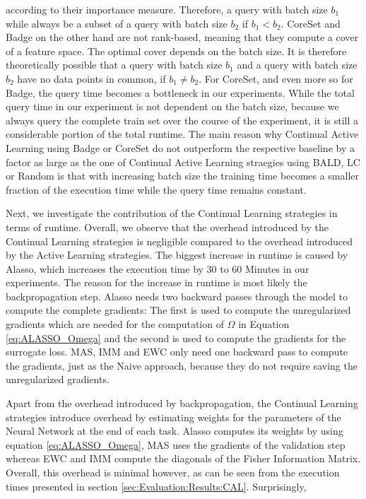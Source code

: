 according to their importance measure. Therefore, a query with batch size $b_1$ while always be a subset of a query with batch size $b_2$ if $b_1 < b_2$. CoreSet and Badge on the other hand are not rank-based, meaning that they compute a cover of a feature space. The
optimal cover depends on the batch size. It is therefore theoretically possible that a query with batch size $b_1$ and a query with batch size $b_2$ have no data points in common, if $b_1 \neq b_2$. For CoreSet, and even more so for Badge, the query time becomes a
bottleneck in our experiments. While the total query time in our experiment is not dependent on the batch size, because we always query the complete train set over the course of the experiment, it is still a considerable portion of the total runtime. The main reason why
Continual Active Learning using Badge or CoreSet do not outperform the respective baseline by a factor as large as the one of Continual Active Learning straegies using BALD, LC or Random is that with increasing batch size the training time becomes a smaller fraction of
the execution time while the query time remains constant. \par
Next, we investigate the contribution of the Continual Learning strategies in terms of runtime. Overall, we observe that the overhead introduced by the Continual Learning strategies is negligible compared to the overhead introduced by the Active Learning strategies. The
biggest increase in runtime is caused by Alasso, which increases the execution time by 30 to 60 Minutes in our experiments. The reason for the increase in runtime is most likely the backpropagation step. Alasso needs two backward passes through the model to compute the
complete gradients: The first is used to compute the unregularized gradients which are needed for the computation of $\Omega$ in Equation \ref{eq:ALASSO_Omega} and the second is used to compute the gradients for the surrogate loss. MAS, IMM and EWC only need one backward
pass to compute the gradients, just as the Naive approach, because they do not require saving the unregularized gradients. \par
Apart from the overhead introduced by backpropagation, the Continual Learning strategies introduce overhead by estimating weights for the parameters of the Neural Network at the end of each task. Alasso computes its weights by using equation \ref{eq:ALASSO_Omega}, MAS
uses the gradients of the validation step whereas EWC and IMM compute the diagonals of the Fisher Information Matrix. Overall, this overhead is minimal however, as can be seen from the execution times presented in section \ref{sec:Evaluation:Results:CAL}. Surprisingly,
